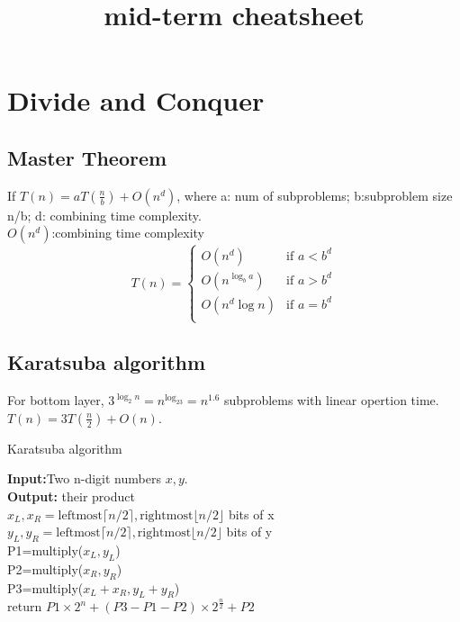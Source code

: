 \documentclass{article}
\begin{document}
\title{mid-term cheatsheet}
\maketitle
\section{Divide and Conquer}
\subsection{Master Theorem}
If $T(n)=aT(\frac{n}{b})+O(n^d)$, where a: num of subproblems; b:subproblem size n/b; d: combining time complexity.\\
$O(n^d)$:combining time complexity\\
\begin{equation}
    T(n)=
    \begin{cases}
        O(n^d) & \text{if } a<b^d\\
        O(n^{\log_b a}) & \text{if } a>b^d \\
        O(n^d \log n) & \text{if } a=b^d\\
    \end{cases}    
\end{equation}

\subsection{Karatsuba algorithm}
For bottom layer, $3^{\log_2n}=n^{\log_23}=n^{1.6}$ subproblems with linear opertion time. $T(n)=3T(\frac{n}{2})+O(n)$.
\begin{algorithm}
    \caption{Karatsuba algorithm}
    \textbf{Input:}Two n-digit numbers $x,y$. \\
    \textbf{Output:} their product\\
    $x_L,x_R=\text{leftmost} \lceil n/2\rceil ,\text{rightmost} \lfloor n/2 \rfloor $ bits of x\\
    $y_L,y_R=\text{leftmost} \lceil n/2\rceil ,\text{rightmost} \lfloor n/2 \rfloor $ bits of y\\
    P1=multiply($x_L,y_L$) \\
    P2=multiply($x_R,y_R$) \\
    P3=multiply($x_L+x_R,y_L+y_R$) \\
    return $P1\times 2^n+(P3-P1-P2)\times 2^{\frac{n}{2}}+P2$
\end{algorithm}
\end{document}
